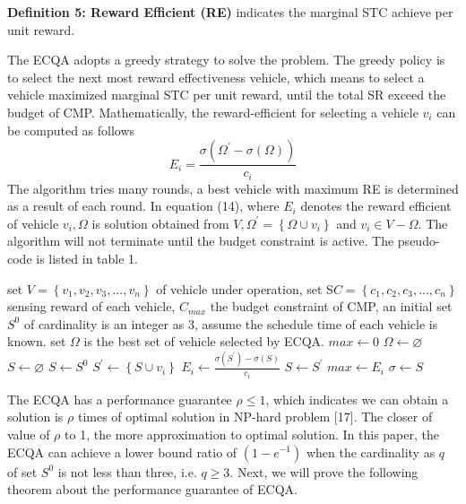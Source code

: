 \documentclass[journal]{IEEEtran}
\begin{document}
\noindent
\textbf{Definition 5: Reward Efficient (RE)} indicates the marginal STC achieve per unit reward.

The ECQA adopts a greedy strategy to solve the problem. The greedy policy is to select the next most reward effectiveness vehicle, which means to select a vehicle maximized marginal STC per unit reward, until the total SR exceed the budget of CMP. Mathematically, the reward-efficient for selecting a vehicle $v_{i}$ can be computed as follows
\begin{equation}
E_{i}=\frac{\sigma (\Omega ^{'}-\sigma (\Omega))}{c_{i}}
\end{equation}
The algorithm tries many rounds, a best vehicle with maximum RE is determined as a result of each round. In equation (14), where $E_{i}$  denotes the reward efficient of vehicle $v_{i}, Ω$ is solution obtained from $V, \Omega ^{'}=\left \{ \Omega\cup v_{i}  \right \}$ and $v_{i}\in V-\Omega $. The algorithm will not terminate until the budget constraint is active. The pseudo-code is listed in table 1.

\renewcommand{\algorithmicrequire}{\textbf{Input:}}
\renewcommand{\algorithmicensure}{\textbf{Output:}}
\begin{algorithm}
	\caption{}	
	\begin{algorithmic}
		\Require set $V=\left \{  v_{1},v_{2},v_{3},...,v_{n}\right \}$ of vehicle under operation, set S$C=\left \{  c_{1},c_{2},c_{3},...,c_{n}\right \}$ sensing reward of each vehicle, $C_{max}$ the budget constraint of CMP, an initial set $S^{0}$ of cardinality is an integer as 3, assume the schedule time of each vehicle is known.
		\Ensure set $\Omega $ is the best set of vehicle selected by ECQA. 
		\State $max \gets 0$
		\State $\Omega \gets \varnothing$
		\State $S \gets \varnothing$
			\State $S \gets S^{0}$
				\State $S^{'} \gets \left \{ S\cup v_{i} \right \}$
				\State $E_{i} \gets \frac{\sigma(S^{'})-\sigma (S)}{c_{i}}$
					\State $S \gets S^{'}$
					\State $max \gets E_{i}$
				\EndIf
					\State $ \sigma \gets S$
				\EndIf
			\EndFor		
		\EndFor				
	\end{algorithmic}
\end{algorithm}


The ECQA has a performance guarantee $ \rho \leqslant 1$, which indicates we can obtain a solution is $\rho$ times of optimal solution in NP-hard problem [17]. The closer of value of $\rho$ to 1, the more approximation to optimal solution. In this paper, the ECQA can achieve a lower bound ratio of  $\left (1-e^{-1}  \right )$ when the cardinality as $q$ of set $S^{0}$ is not less than three, i.e. $q\geqslant 3$. Next, we will prove the following theorem about the performance guarantee of ECQA.
\end{document}
